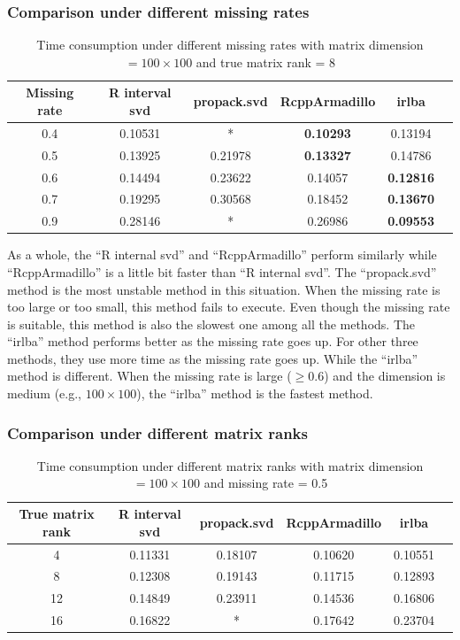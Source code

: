 \documentclass[12pt]{article}
\begin{document}
	\subsubsection{Comparison under different missing rates}
	
	\begin{table}[ht]
		\centering
		\caption{Time consumption under different missing rates with matrix dimension $=100\times 100$ and true matrix rank = 8 }\label{missing rate}
		\begin{tabular}{cccccc}
			\hline\hline
			Missing rate & R interval svd & propack.svd & RcppArmadillo & irlba\\
			\hline
		0.4&0.10531&*&\textbf{0.10293}&0.13194\\
		0.5&0.13925&0.21978&\textbf{0.13327}&0.14786\\
		0.6&0.14494&0.23622&0.14057&\textbf{0.12816}\\
		0.7&0.19295&0.30568&0.18452&\textbf{0.13670}\\
		0.9&0.28146&*&0.26986&\textbf{0.09553}\\
			\hline\hline
		\end{tabular}
	\end{table}
	
As a whole, the “R internal svd” and “RcppArmadillo” perform similarly while “RcppArmadillo” is a little bit faster than “R internal svd”. The “propack.svd” method is the most unstable method in this situation. When the missing rate is too large or too small, this method fails to execute. Even though the missing rate is suitable, this method is also the slowest one among all the methods. The “irlba” method performs better as the missing rate goes up. For other three methods, they use more time as the missing rate goes up. While the “irlba” method is different. When the missing rate is large ($\geq 0.6$) and the dimension is medium (e.g., $100\times100$), the “irlba” method is the fastest method.

	\subsubsection{Comparison under different matrix ranks}
	
	\begin{table}[ht]
		\centering
		\caption{Time consumption under different matrix ranks with matrix dimension $=100\times 100$ and missing rate = 0.5}\label{rank}
		\begin{tabular}{cccccc}
			\hline\hline
			True matrix rank & R interval svd & propack.svd & RcppArmadillo & irlba\\
			\hline
4&0.11331&0.18107&0.10620&0.10551\\
8&0.12308&0.19143&0.11715&0.12893\\
12&0.14849&0.23911&0.14536&0.16806\\
16&0.16822&*&0.17642&0.23704\\
			\hline\hline
		\end{tabular}
	\end{table}
	
\end{document}
